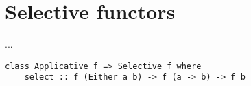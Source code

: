 \section{Selective functors}\label{sec-selective}

...


\begin{verbatim}
class Applicative f => Selective f where
    select :: f (Either a b) -> f (a -> b) -> f b
\end{verbatim}
